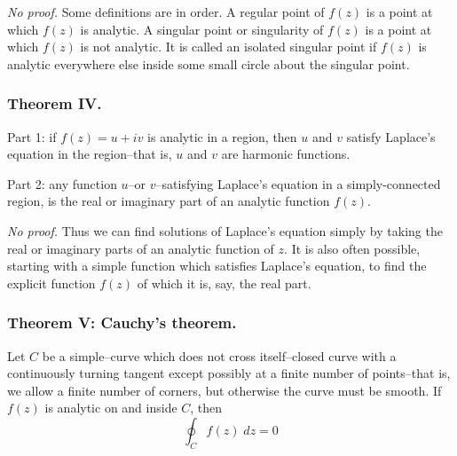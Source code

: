 \documentclass[../../../main.tex]{subfiles}
\begin{document}
\emph{No proof.} Some definitions are in order. A regular point of $f (z)$ is a point at which $f (z)$ is analytic. A singular point or singularity of $f (z)$ is a point at which $f (z)$ is not analytic. It is called an isolated singular point if $f (z)$ is analytic everywhere else inside some small circle about the singular point.

\subsubsection{Theorem IV.} Part 1: if $f(z) = u +iv$ is analytic in a region, then $u$ and $v$ satisfy Laplace's equation in the region--that is, $u$ and $v$ are harmonic functions. 

Part 2: any function $u$--or $v$--satisfying Laplace's equation in a simply-connected region, is the real or imaginary part of an analytic function $f(z)$.

\emph{No proof.} Thus we can find solutions of Laplace's equation simply by taking the real or imaginary parts of an analytic function of $z$. It is also often possible, starting with a simple function which satisfies Laplace's equation, to find the explicit function $f (z)$ of which it is, say, the real part.

\subsubsection{Theorem V: Cauchy's theorem.} Let $C$ be a simple--curve which does not cross itself--closed curve with a continuously turning tangent except possibly at a ﬁnite number of points--that is, we allow a ﬁnite number of corners, but otherwise the curve must be smooth. If $f(z)$ is analytic on and inside $C$, then
\begin{equation*}
    \oint_C f(z) \;dz = 0
\end{equation*}
\end{document}
